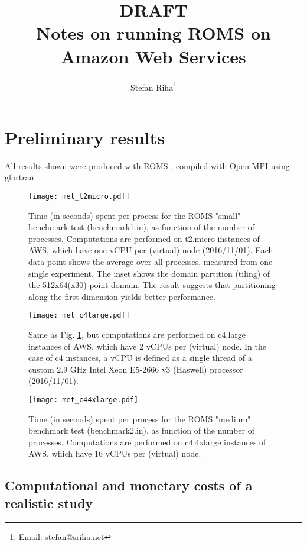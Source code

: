 \documentclass[12pt,a4paper]{article}
\title{
	{\bf DRAFT}\\
	Notes on running ROMS on Amazon Web Services 
}
\author{Stefan Riha\thanks{Email: stefan@sriha.net}}
\begin{document}
	\setlength{\parindent}{0cm}
	\maketitle

\section{Preliminary results}
	All results shown were produced with ROMS \citep{shchepetkin2005regional}, compiled with Open MPI using gfortran.
	
	\begin{figure}[H]
		\centering
		\texttt{[image: met\_t2micro.pdf]}
		\caption{Time (in seconds) spent per process for the ROMS "small" benchmark test (benchmark1.in), as function of the number of processes. Computations are performed on t2.micro instances of AWS, which have one vCPU per (virtual) node (2016/11/01). Each data point shows the average over all processes, measured from one single experiment. The inset shows the domain partition (tiling) of the 512x64(x30) point domain. The result suggests that partitioning along the first dimension yields better performance.}
		\label{fig:met_t2micro}
	\end{figure}

	\begin{figure}[H]
	\centering
	\texttt{[image: met\_c4large.pdf]}
	\caption{Same as Fig. \ref{fig:met_t2micro}, but computations are performed on c4.large instances of AWS, which have 2 vCPUs per (virtual) node. In the case of c4 instances, a vCPU is defined as a single thread of a custom 2.9 GHz Intel Xeon E5-2666 v3 (Haswell) processor (2016/11/01).}
	\label{fig:met_c4large}
\end{figure}

\begin{figure}[H]
	\centering
	\texttt{[image: met\_c44xlarge.pdf]}
	\caption{Time (in seconds) spent per process for the ROMS "medium" benchmark test (benchmark2.in), as function of the number of processes. Computations are performed on c4.4xlarge instances of AWS, which have 16 vCPUs per (virtual) node.}
	\label{fig:met_c4large}
\end{figure}

\subsection{Computational and monetary costs of a realistic study}
\end{document}
